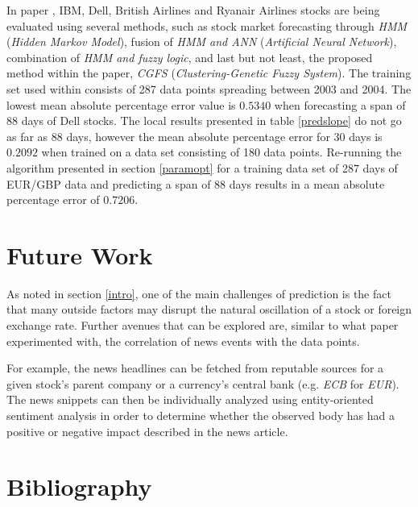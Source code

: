\documentclass[a4paper,12pt]{article}
\begin{document}
	In paper \cite{hadavandi2010integration}, IBM, Dell, British Airlines and Ryanair Airlines stocks are being evaluated using several methods, such as stock market forecasting through \textit{HMM}\cite{hassan2005stock} (\textit{Hidden Markov Model}), fusion of \textit{HMM and ANN}\cite{hassan2007fusion} (\textit{Artificial Neural Network}), combination of \textit{HMM and fuzzy logic}\cite{hassan2009combination}, and last but not least, the proposed method within the paper, \textit{CGFS} (\textit{Clustering-Genetic Fuzzy System}). The training set used within consists of 287 data points spreading between 2003 and 2004. The lowest mean absolute percentage error value is $0.5340$ when forecasting a span of 88 days of Dell stocks. The local results presented in table \ref{predslope} do not go as far as 88 days, however the mean absolute percentage error for 30 days is $0.2092$ when trained on a data set consisting of 180 data points. Re-running the algorithm presented in section \ref{paramopt} for a training data set of 287 days of EUR/GBP data and predicting a span of 88 days results in a mean absolute percentage error of $0.7206$.

\section{Future Work}

	As noted in section \ref{intro}, one of the main challenges of prediction is the fact that many outside factors may disrupt the natural oscillation of a stock or foreign exchange rate. Further avenues that can be explored are, similar to what paper \cite{zhai2007combining} experimented with, the correlation of news events with the data points.
	
	For example, the news headlines can be fetched from reputable sources for a given stock's parent company or a currency's central bank (e.g. \textit{ECB} for \textit{EUR}). The news snippets can then be individually analyzed using entity-oriented sentiment analysis in order to determine whether the observed body has had a positive or negative impact described in the news article.

\newpage
\section{Bibliography}

	\begingroup
	\renewcommand{\section}[2]{}
		
		
	\endgroup
\end{document}
